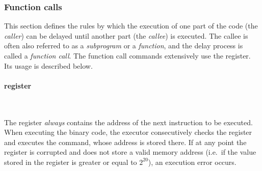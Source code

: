 \hypertarget{cmd:calls}{
    \subsubsection{Function calls}
}


\vspace{0.5cm}

This section defines the rules by which the execution of one part of the code
(the \textit{caller}) can be delayed until another part (the \textit{callee})
is executed.
The callee is often also referred to as a \textit{subprogram} or
a \textit{function}, and the delay process is called a \textit{function call}.
The function call commands extensively use the  register.
Its usage is described below.

\vspace{-0.35cm}

\paragraph{ register}\

The  register \textit{always} contains the address of the next
instruction to be executed.
When executing the binary code, the  executor consecutively checks
the  register and executes the command, whose address is stored there.
If at any point the  register is corrupted and does not store
a valid memory address
(i.e.\ if the value stored in the  register is greater or equal
to $2^{20}$), an execution error occurs.

